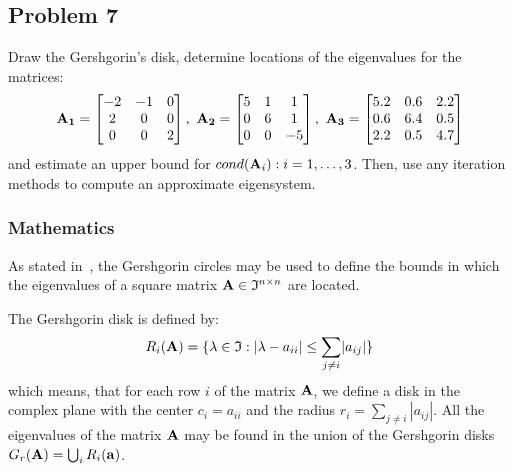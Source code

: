 \subsection{Problem 7}%
\label{sec:problem_7}

Draw the Gershgorin's disk, determine locations of the eigenvalues for the matrices:
\begin{equation*}
    \matr{A_1} = 
    \begin{bmatrix}
        -2 & -1 &  0\\
         2 &  0 &  0\\
         0 &  0 &  2
    \end{bmatrix},\ 
    \matr{A_2} = 
    \begin{bmatrix}
        5 & 1 &  1\\
        0 & 6 &  1\\
        0 & 0 &  -5
    \end{bmatrix},\ 
    \matr{A_3} = 
    \begin{bmatrix}
        5.2 &  0.6 &  2.2\\
        0.6 &  6.4 &  0.5\\
        2.2 &  0.5 &  4.7
    \end{bmatrix}
\end{equation*}
and estimate an upper bound for $cond(\mathbf{A}_i) : i = 1, \ldots, 3$.
Then, use any iteration methods to compute an approximate eigensystem.
\subsubsection*{Mathematics}
As stated in~\cite{Zdunek}, the Gershgorin circles may be used to define the bounds in
which the eigenvalues of a square matrix $\mathbf{A}\in\mathfrak{I}^{n\times{}n}$ are
located.

The Gershgorin disk is defined by:
\begin{equation}
    R_i(\mathbf{A}) = \{\lambda\in\mathfrak{I}:\lvert\lambda-a_{ii}\rvert\le\sum_{j\ne{}i}\lvert{}a_{ij}\rvert\}
\end{equation}
which means, that for each row $i$ of the matrix $\mathbf{A}$, we define a disk in the
complex plane with the center $c_i = a_{ii}$ and the radius $r_i = \sum_{j \neq i} |a_{ij}|$.
All the eigenvalues of the matrix $\mathbf{A}$ may be found in the union of the Gershgorin
disks $G_r(\mathbf{A}) = \bigcup_i R_i(\mathbf{a})$.
